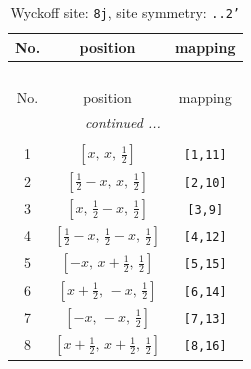 \documentclass[fleqn,8pt]{jsarticle}
\begin{document}
\begin{longtable}{ccc}
\caption{Wyckoff site: {\tt 8j}, site symmetry: {\tt ..2'}}
 \\
 \hline \hline
No. & position & mapping \\ \hline \endfirsthead

\multicolumn{2}{l}{\tablename\ \thetable{}} \\
 \hline \hline
No. & position & mapping \\ \hline \endhead

 \hline \hline
\multicolumn{2}{r}{\footnotesize\it continued ...} \\ \endfoot

 \hline \hline
\multicolumn{2}{r}{} \\ \endlastfoot

1 & $\left[ x,\, x,\, \frac{1}{2} \right]$ & {\tt [1,11]} \\ \hline
2 & $\left[ \frac{1}{2} - x,\, x,\, \frac{1}{2} \right]$ & {\tt [2,10]} \\ \hline
3 & $\left[ x,\, \frac{1}{2} - x,\, \frac{1}{2} \right]$ & {\tt [3,9]} \\ \hline
4 & $\left[ \frac{1}{2} - x,\, \frac{1}{2} - x,\, \frac{1}{2} \right]$ & {\tt [4,12]} \\ \hline
5 & $\left[ - x,\, x + \frac{1}{2},\, \frac{1}{2} \right]$ & {\tt [5,15]} \\ \hline
6 & $\left[ x + \frac{1}{2},\, - x,\, \frac{1}{2} \right]$ & {\tt [6,14]} \\ \hline
7 & $\left[ - x,\, - x,\, \frac{1}{2} \right]$ & {\tt [7,13]} \\ \hline
8 & $\left[ x + \frac{1}{2},\, x + \frac{1}{2},\, \frac{1}{2} \right]$ & {\tt [8,16]} \\
\end{longtable}
\renewcommand{\arraystretch}{1.2}
\end{document}
